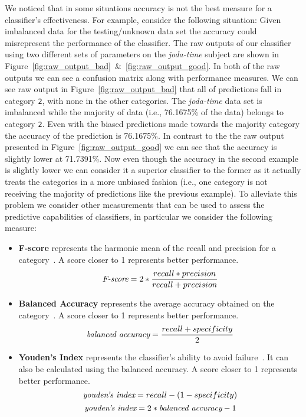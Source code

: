 We noticed that in some situations accuracy is not the best measure for a classifier's effectiveness. For example, consider the following situation: Given imbalanced data for the testing/unknown data set the accuracy could misrepresent the performance of the classifier. The raw outputs of our classifier using two different sets of parameters on the \emph{joda-time} subject are shown in Figure~\ref{fig:raw_output_bad}~\&~\ref{fig:raw_output_good}. In both of the raw outputs we can see a confusion matrix along with performance measures. We can see raw output in Figure~\ref{fig:raw_output_bad} that all of predictions fall in category \texttt{2}, with none in the other categories. The \emph{joda-time} data set is imbalanced while the majority of data (i.e., 76.1675\% of the data) belongs to category \texttt{2}. Even with the biased predictions made towards the majority category the accuracy of the prediction is 76.1675\%. In contrast to the the raw output presented in Figure~\ref{fig:raw_output_good} we can see that the accuracy is slightly lower at 71.7391\%. Now even though the accuracy in the second example is slightly lower we can consider it a superior classifier to the former as it actually treats the categories in a more unbiased fashion (i.e., one category is not receiving the majority of predictions like the previous example). To alleviate this problem we consider other measurements that can be used to assess the predictive capabilities of classifiers, in particular we consider the following measure:

\begin{itemize}
  \item \textbf{F-score} represents the harmonic mean of the recall and precision for a category~\cite{SJS06}. A score closer to 1 represents better performance.
  \begin{equation}
    \emph{$\text{F-score} = 2*\frac{recall * precision}{recall + precision}$}
    \label{equ:f_score}
  \end{equation}

  \item \textbf{Balanced Accuracy} represents the average accuracy obtained on the category~\cite{BOSB10, SJS06}. A score closer to 1 represents better performance.
  \begin{equation}
    \emph{$\text{balanced accuracy} = \frac{recall + specificity}{2}$}
    \label{equ:balanced_area_under_curve}
  \end{equation}

  \item \textbf{Youden's Index} represents the classifier's ability to avoid failure~\cite{SJS06}. It can also be calculated using the balanced accuracy. A score closer to 1 represents better performance.
  \begin{equation}
    \emph{$\text{youden's index} = recall - ( 1 - specificity)$}
    \label{equ:youden_index_a}
  \end{equation}
  \begin{equation}
    \emph{$\text{youden's index} = 2 * \text{balanced accuracy} - 1$}
    \label{equ:youden_index_b}
  \end{equation}
\end{itemize}

